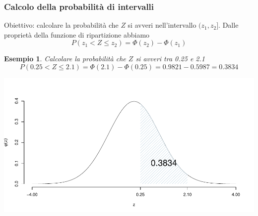 \documentclass[
  11pt,
]{book}
\theoremstyle{mytheoremstyle}
\theoremstyle{mydefstyle}
\newtheorem{example}{{Esempio}}[section]
\begin{document}
\subsubsection{Calcolo della probabilità di intervalli}\label{calcolo-della-probabilituxe0-di-intervalli}

Obiettivo: calcolare la probabilità che \(Z\) si avveri nell'intervallo \((z_1,z_2]\).
Dalle proprietà della funzione di ripartizione abbiamo
\[P(z_1<Z\leq z_2) = \Phi(z_2)-\Phi(z_1)\]

\begin{example}

Calcolare la probabilità che \(Z\) si avveri tra 0.25 e 2.1
\[P(0.25< Z \leq 2.1) = \Phi(2.1)-\Phi(0.25)=0.9821-0.5987=0.3834\]

\begin{center}\includegraphics{Appunti_di_Statistica_2025_files/figure-latex/07c-Normale-21,-1} \end{center}

\end{example}
\end{document}
